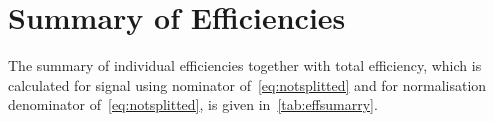 

\section{Summary of Efficiencies}
\label{EfficiencySummary}

The summary of individual efficiencies together with total efficiency, which is calculated for signal using nominator of~\autoref{eq:notsplitted} and for normalisation denominator of~\autoref{eq:notsplitted}, is given in~\autoref{tab:effsumarry}.
